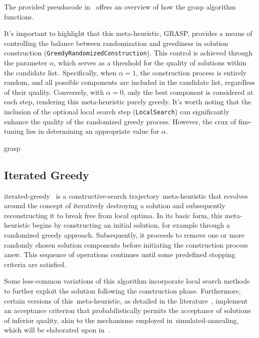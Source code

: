 The provided pseudocode in~ offers an overview of how the
\acrshort{grasp} algorithm functions.

It's important to highlight that this meta-heuristic, GRASP, provides a means of
controlling the balance between randomization and greediness in solution
construction (\texttt{GreedyRandomizedConstruction}). This control is
achieved through the parameter $\alpha$, which serves as a threshold for the
quality of solutions within the candidate list.~Specifically, when $\alpha = 1$,
the construction process is entirely random, and all possible components are
included in the candidate list, regardless of their quality. Conversely, with
$\alpha = 0$, only the best component is considered at each step, rendering this
\acrshort{meta-heuristic} purely greedy. It's worth noting that the inclusion of
the optional local search step (\texttt{LocalSearch}) can significantly
enhance the quality of the randomized greedy process. However, the crux of
fine-tuning lies in determining an appropriate value for $\alpha$.

\begin{algorithm}
  
  \caption{\acrlong{grasp}}
  \label{algorithm:grasp}
\end{algorithm}

\subsection{Iterated Greedy}
\label{subsec:iterated-greedy}

\acrfull{iterated-greedy}~\cite{stutzle2018iterated,outeiro2021application} is a
\acrshort{constructive-search} trajectory~\acrshort{meta-heuristic} that
revolves around the concept of iteratively destroying a solution and
subsequently reconstructing it to break free from local optima. In its basic
form, this \acrshort{meta-heuristic} begins by constructing an initial solution,
for example through a randomized greedy approach. Subsequently, it proceeds to
remove one or more randomly chosen solution components before initiating the
construction process anew. This sequence of operations continues until some
predefined stopping criteria are satisfied.

Some less-common variations of this algorithm incorporate local search methods
to further exploit the solution following the construction phase. Furthermore,
certain versions of this~\acrshort{meta-heuristic}, as detailed in the
literature~\cite{stutzle2018iterated}, implement an acceptance criterion that
probabilistically permits the acceptance of solutions of inferior quality, akin
to the mechanisms employed in~\acrshort{simulated-annealing}, which will be
elaborated upon in~.


